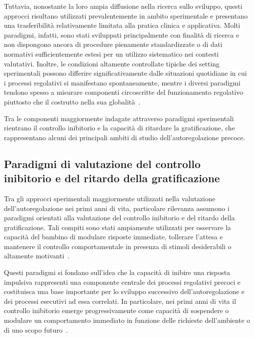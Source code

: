             Tuttavia, nonostante la loro ampia diffusione nella ricerca sullo sviluppo, questi approcci risultano utilizzati prevalentemente in ambito sperimentale e presentano una trasferibilità relativamente limitata alla pratica clinica e applicativa. Molti paradigmi, infatti, sono stati sviluppati principalmente con finalità di ricerca e non dispongono ancora di procedure pienamente standardizzate o di dati normativi sufficientemente estesi per un utilizzo sistematico nei contesti valutativi. Inoltre, le condizioni altamente controllate tipiche dei setting sperimentali possono differire significativamente dalle situazioni quotidiane in cui i processi regolativi si manifestano spontaneamente, mentre i diversi paradigmi tendono spesso a misurare componenti circoscritte del funzionamento regolativo piuttosto che il costrutto nella sua globalità~\cite{toplak2013,snyder2021,nigg2017}.

            Tra le componenti maggiormente indagate attraverso paradigmi sperimentali rientrano il controllo inibitorio e la capacità di ritardare la gratificazione, che rappresentano alcuni dei principali ambiti di studio dell'autoregolazione precoce.

        \subsection{Paradigmi di valutazione del controllo inibitorio e del ritardo della gratificazione}
        \label{sec:3_4_2}

            Tra gli approcci sperimentali maggiormente utilizzati nella valutazione dell'autoregolazione nei primi anni di vita, particolare rilevanza assumono i paradigmi orientati alla valutazione del controllo inibitorio e del ritardo della gratificazione. Tali compiti sono stati ampiamente utilizzati per osservare la capacità del bambino di modulare risposte immediate, tollerare l'attesa e mantenere il controllo comportamentale in presenza di stimoli desiderabili o altamente motivanti~\cite{kochanska2000,zelazo2012}.

            Questi paradigmi si fondano sull'idea che la capacità di inibire una risposta impulsiva rappresenti una componente centrale dei processi regolativi precoci e costituisca una base importante per lo sviluppo successivo dell'autoregolazione e dei processi esecutivi ad essa correlati. In particolare, nei primi anni di vita il controllo inibitorio emerge progressivamente come capacità di sospendere o modulare un comportamento immediato in funzione delle richieste dell'ambiente o di uno scopo futuro~\cite{diamond2013}.

